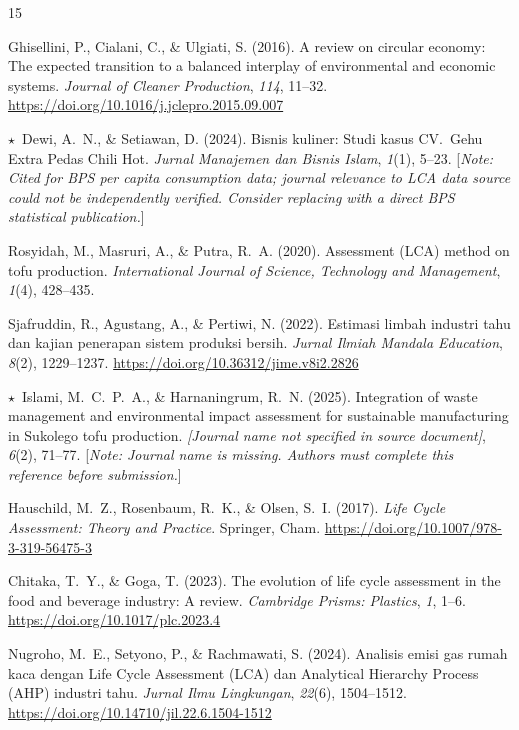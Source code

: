 \documentclass[12pt,a4paper]{article}
\begin{document}
\begin{thebibliography}{15}
\small

Ghisellini, P., Cialani, C., \& Ulgiati, S. (2016).
A review on circular economy: The expected transition to a balanced interplay of environmental and
economic systems.
\textit{Journal of Cleaner Production}, \textit{114}, 11--32.
\url{https://doi.org/10.1016/j.jclepro.2015.09.007}

\textcolor{warnamber}{$\star$}~Dewi, A.~N., \& Setiawan, D. (2024).
Bisnis kuliner: Studi kasus CV.\ Gehu Extra Pedas Chili Hot.
\textit{Jurnal Manajemen dan Bisnis Islam}, \textit{1}(1), 5--23.
[\textit{Note: Cited for BPS per capita consumption data; journal relevance to LCA data source could
not be independently verified. Consider replacing with a direct BPS statistical publication.}]

Rosyidah, M., Masruri, A., \& Putra, R.~A. (2020).
Assessment (LCA) method on tofu production.
\textit{International Journal of Science, Technology and Management}, \textit{1}(4), 428--435.

Sjafruddin, R., Agustang, A., \& Pertiwi, N. (2022).
Estimasi limbah industri tahu dan kajian penerapan sistem produksi bersih.
\textit{Jurnal Ilmiah Mandala Education}, \textit{8}(2), 1229--1237.
\url{https://doi.org/10.36312/jime.v8i2.2826}

\textcolor{warnamber}{$\star$}~Islami, M.~C.~P.~A., \& Harnaningrum, R.~N. (2025).
Integration of waste management and environmental impact assessment for sustainable manufacturing in
Sukolego tofu production.
\textit{[Journal name not specified in source document]}, \textit{6}(2), 71--77.
[\textit{Note: Journal name is missing. Authors must complete this reference before submission.}]

Hauschild, M.~Z., Rosenbaum, R.~K., \& Olsen, S.~I. (2017).
\textit{Life Cycle Assessment: Theory and Practice}.
Springer, Cham.
\url{https://doi.org/10.1007/978-3-319-56475-3}

Chitaka, T.~Y., \& Goga, T. (2023).
The evolution of life cycle assessment in the food and beverage industry: A review.
\textit{Cambridge Prisms: Plastics}, \textit{1}, 1--6.
\url{https://doi.org/10.1017/plc.2023.4}

Nugroho, M.~E., Setyono, P., \& Rachmawati, S. (2024).
Analisis emisi gas rumah kaca dengan Life Cycle Assessment (LCA) dan Analytical Hierarchy Process
(AHP) industri tahu.
\textit{Jurnal Ilmu Lingkungan}, \textit{22}(6), 1504--1512.
\url{https://doi.org/10.14710/jil.22.6.1504-1512}


\end{thebibliography}
\end{document}
